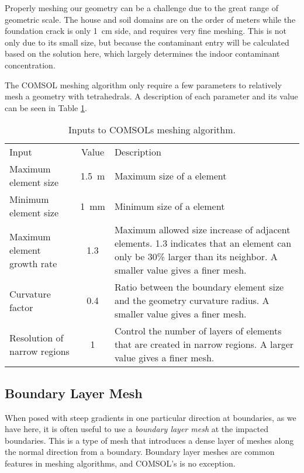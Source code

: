 Properly meshing our geometry can be a challenge due to the great range of geometric scale.
The house and soil domains are on the order of meters while the foundation crack is only \SI{1}{\centi\meter} side, and requires very fine meshing.
This is not only due to its small size, but because the contaminant entry will be calculated based on the solution here, which largely determines the indoor contaminant concentration.\par

The COMSOL meshing algorithm only require a few parameters to relatively mesh a geometry with tetrahedrals.
A description of each parameter and its value can be seen in Table \ref{tbl:meshing}.
\begin{table}[htb!]
  \caption{Inputs to COMSOLs meshing algorithm.}
  \label{tbl:meshing}
  \begin{tabularx}{\linewidth}{l c X}
    \toprule
    Input & Value & Description \\
    Maximum element size & \SI{1.5}{\metre} & Maximum size of a element \\
    Minimum element size & \SI{1}{\milli\metre} & Minimum size of a element \\
    Maximum element growth rate & 1.3 & Maximum allowed size increase of adjacent elements. 1.3 indicates that an element can only be 30\% larger than its neighbor. A smaller value gives a finer mesh. \\
    Curvature factor & 0.4 & Ratio between the boundary element size and the geometry curvature radius. A smaller value gives a finer mesh. \\
    Resolution of narrow regions & 1 & Control the number of layers of elements that are created in narrow regions. A larger value gives a finer mesh. \\
    \bottomrule
  \end{tabularx}
\end{table}

\subsection{Boundary Layer Mesh}

When posed with steep gradients in one particular direction at boundaries, as we have here, it is often useful to use a \textit{boundary layer mesh} at the impacted boundaries.
This is a type of mesh that introduces a dense layer of meshes along the normal direction from a boundary.
Boundary layer meshes are common features in meshing algorithms, and COMSOL's is no exception.\par

